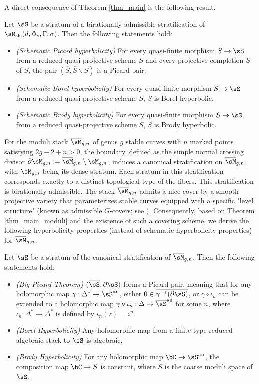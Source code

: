 \documentclass[11pt,letterpaper]{amsart}
\numberwithin{equation}{section}
\begin{document}
	A direct consequence of Theorem \ref{thm_main} is the following result.  
	\begin{thm}\label{thm_main_moduli}  
		Let $\sS$ be a stratum of a birationally admissible stratification of $\sM_{\rm slc}(d, \Phi_c, \Gamma, \sigma)$. Then the following statements hold:  
		\begin{itemize}  
			\item \emph{(Schematic Picard hyperbolicity)} For every quasi-finite morphism $S\to\sS$ from a reduced quasi-projective scheme $S$ and every projective completion $\overline{S}$ of $S$, the pair $(\overline{S},\overline{S}\backslash S)$ is a Picard pair.
			\item \emph{(Schematic Borel hyperbolicity)} For every quasi-finite morphism $S\to\sS$ from a reduced quasi-projective scheme $S$, $S$ is Borel hyperbolic.
			\item \emph{(Schematic Brody hyperbolicity)} For every quasi-finite morphism $S\to\sS$ from a reduced quasi-projective scheme $S$, $S$ is Brody hyperbolic.
		\end{itemize}  
	\end{thm}  
	For the moduli stack $\overline{\sM}_{g,n}$ of genus $g$ stable curves with $n$ marked points satisfying $2g - 2 + n > 0$, the boundary, defined as the simple normal crossing divisor $\partial\sM_{g,n} := \overline{\sM}_{g,n} \setminus \sM_{g,n}$, induces a canonical stratification on $\overline{\sM}_{g,n}$, with $\sM_{g,n}$ being its dense stratum. Each stratum in this stratification corresponds exactly to a distinct topological type of the fibers. This stratification is birationally admissible. The stack $\overline{\sM}_{g,n}$ admits a nice cover by a smooth projective variety that parameterizes stable curves equipped with a specific "level structure" (known as admissible $G$-covers; see \cite[Chapter XVI]{Griffiths2011}). Consequently, based on Theorem \ref{thm_main_moduli} and the existence of such a covering scheme, we derive the following hyperbolicity properties (instead of schematic hyperbolicity properties) for $\overline{\sM}_{g,n}$.
	\begin{cor}\label{cor_M_gn_stratum_hyperbolic}
		Let $\sS$ be a stratum of the canonical stratification of $\overline{\sM}_{g,n}$. Then the following statements hold:  
		\begin{itemize}  
			\item \emph{(Big Picard Theorem)} $(\overline{\sS}, \partial\sS)$ forms a Picard pair, meaning that for any holomorphic map $\gamma: \Delta^\ast \to \sS^{\rm an}$, either $0 \in \overline{\gamma^{-1}(\partial\sS)}$, or $\gamma \circ \iota_n$ can be extended to a holomorphic map $\overline{\gamma \circ \iota_n}: \Delta \to \overline{\sS}^{\rm an}$ for some $n$, where $\iota_n: \Delta^\ast \to \Delta^\ast$ is defined by $\iota_n(z) = z^n$.  
			\item \emph{(Borel Hyperbolicity)} Any holomorphic map from a finite type reduced algebraic stack to $\sS$ is algebraic.  
			\item \emph{(Brody Hyperbolicity)} For any holomorphic map $\bC \to \sS^{\rm an}$, the composition map $\bC\to S$ is constant, where $S$ is the coarse moduli space of $\sS$.
		\end{itemize}
	\end{cor}
\end{document}
